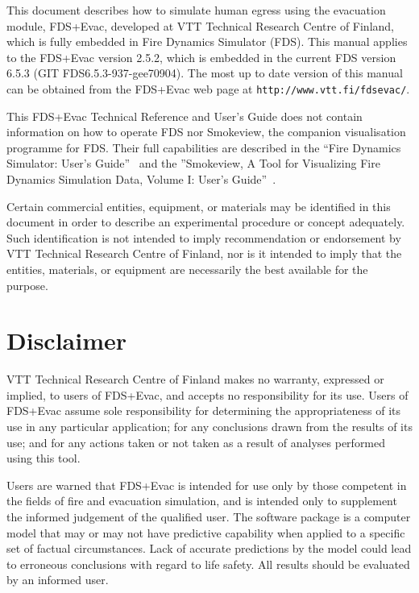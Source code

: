 \documentclass[12pt,a4paper,final,twoside]{stylevk}
\begin{document}
\noindent This document describes how to simulate human egress using
the evacuation module, FDS+Evac, developed at VTT Technical Research
Centre of Finland, which is fully embedded in Fire Dynamics Simulator
(FDS).  This manual applies to the FDS+Evac version 2.5.2, which is
embedded in the current FDS version 6.5.3 (GIT FDS6.5.3-937-gee70904).
The most up to date version of this manual can be obtained from the
FDS+Evac web page at
\texttt{http://www.vtt.fi/}\linebreak[4]\texttt{fdsevac/}.


This FDS+Evac Technical Reference and User's Guide does not contain
information on how to operate FDS nor Smokeview, the companion
visualisation programme for FDS.  Their full capabilities are
described in the ``Fire Dynamics Simulator: User's
Guide''~\cite{FDS_UserGuide} and the ''Smokeview, A Tool for
Visualizing Fire Dynamics Simulation Data,  Volume I: User's
Guide''~\cite{SV_UserGuide}.


Certain commercial entities, equipment, or materials may be identified
in this document in order to describe an experimental procedure or
concept adequately.  Such identification is not intended to imply
recommendation or endorsement by VTT Technical Research Centre of
Finland, nor is it intended to imply that the entities, materials, or
equipment are necessarily the best available for the purpose.


\newpage


\chapter*{Disclaimer}

\noindent VTT Technical Research Centre of Finland makes no warranty,
expressed or implied, to users of FDS+Evac, and accepts no
responsibility for its use.  Users of FDS+Evac assume sole
responsibility for determining the appropriateness of its use in any
particular application; for any conclusions drawn from the results of
its use; and for any actions taken or not taken as a result of
analyses performed using this tool.


Users are warned that FDS+Evac is intended for use only by those
competent in the fields of fire and evacuation simulation, and is
intended only to supplement the informed judgement of the qualified
user.  The software package is a computer model that may or may not
have predictive capability when applied to a specific set of factual
circumstances.  Lack of accurate predictions by the model could lead
to erroneous conclusions with regard to life safety.  All results
should be evaluated by an informed user.
\end{document}
